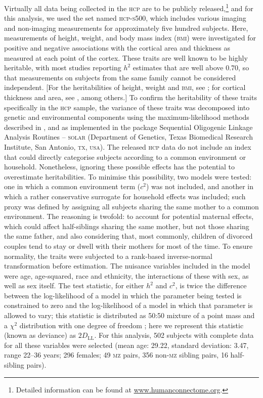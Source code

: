 Virtually all data being collected in the \textsc{hcp} are to be publicly released,\footnote{Detailed information can be found at \href{http://www.humanconnectome.org}{www.humanconnectome.org}.} and for this analysis, we used the set named \textsc{hcp-s500}, which includes various imaging and non-imaging measurements for approximately five hundred subjects. Here, measurements of height, weight, and body mass index (\textsc{bmi}) \citep{Barch2013} were investigated for positive and negative associations with the cortical area and thickness as measured at each point of the cortex. These traits are well known to be highly heritable, with most studies reporting $h^2$ estimates that are well above 0.70, so that measurements on subjects from the same family cannot be considered independent. [For the heritabilities of height, weight and \textsc{bmi}, see \citet{Farooqi2005, Visscher2006, Walley2006, Silventoinen2009, Silventoinen2012, Min2013}; for cortical thickness and area, see \citet{Panizzon2009, Winkler2010, Joshi2011, Eyler2011, Eyler2012, Kremen2013, McKay2014}, among others.] To confirm the heritability of these traits specifically in the \textsc{hcp} sample, the variance of these traits was decomposed into genetic and environmental components using the maximum-likelihood methods described in \citet{Almasy1998}, and as implemented in the package Sequential Oligogenic Linkage Analysis Routines -- \textsc{solar} (Department of Genetics, Texas Biomedical Research Institute, San Antonio, \textsc{tx}, \textsc{usa}). The released \textsc{hcp} data do not include an index that could directly categorise subjects according to a common environment or household. Nonetheless, ignoring these possible effects has the potential to overestimate heritabilities. To minimise this possibility, two models were tested: one in which a common environment term ($c^2$) was not included, and another in which a rather conservative surrogate for household effects was included; such proxy was defined by assigning all subjects sharing the same mother to a common environment. The reasoning is twofold: to account for potential maternal effects, which could affect half-siblings sharing the same mother, but not those sharing the same father, and also considering that, most commonly, children of divorced couples tend to stay or dwell with their mothers for most of the time. To ensure normality, the traits were subjected to a rank-based inverse-normal transformation before estimation. The nuisance variables included in the model were age, age-squared, race and ethnicity, the interactions of these with sex, as well as sex itself. The test statistic, for either $h^2$ and $c^2$, is twice the difference between the log-likelihood of a model in which the parameter being tested is constrained to zero and the log-likelihood of a model in which that parameter is allowed to vary; this statistic is distributed as 50:50 mixture of a point mass and a $\chi^2$ distribution with one degree of freedom \citep{Self1987}; here we represent this statistic (known as deviance) as $2D_{\text{LL}}$. For this analysis, 502 subjects with complete data for all these variables were selected (mean age: 29.22, standard deviation: 3.47, range 22--36 years; 296 females; 49 \textsc{mz} pairs, 356 non-\textsc{mz} sibling pairs, 16 half-sibling pairs).

